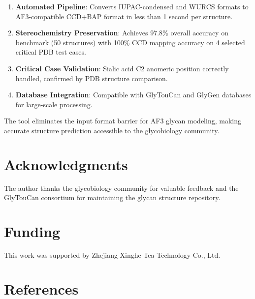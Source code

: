 \documentclass[11pt,a4paper]{article}
\begin{document}
\begin{enumerate}
\item \textbf{Automated Pipeline}: Converts IUPAC-condensed and WURCS formats to AF3-compatible CCD+BAP format in less than 1 second per structure.

\item \textbf{Stereochemistry Preservation}: Achieves 97.8\% overall accuracy on benchmark (50 structures) with 100\% CCD mapping accuracy on 4 selected critical PDB test cases.

\item \textbf{Critical Case Validation}: Sialic acid C2 anomeric position correctly handled, confirmed by PDB structure comparison.

\item \textbf{Database Integration}: Compatible with GlyTouCan and GlyGen databases for large-scale processing.
\end{enumerate}

The tool eliminates the input format barrier for AF3 glycan modeling, making accurate structure prediction accessible to the glycobiology community.

\section*{Acknowledgments}

The author thanks the glycobiology community for valuable feedback and the GlyTouCan consortium for maintaining the glycan structure repository.

\section*{Funding}

This work was supported by Zhejiang Xinghe Tea Technology Co., Ltd.

\section*{References}



\end{document}
